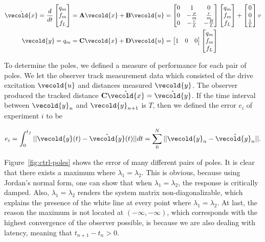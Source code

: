 \documentclass[11pt,titlepage]{report}
\let\vec\vecold
\newcommand{\vec}[1]{\mathbf{#1}}
\begin{document}
\begin{align} \label{eq:ctrl-bond-model}
	\dot{\vec{x}} = \frac{d}{dt}
	\begin{bmatrix}
		q_m \\
		f_m \\
		f_L
	\end{bmatrix} &= \mat{A} \vec{x} + \mat{B} \vec{u} =
	\begin{bmatrix}
		0 & 1 & 0 \\
		0 & -\frac{\rho}{m} & \frac{r}{m} \\
		0 & -\frac{r}{L} & -\frac{R}{L}
	\end{bmatrix}
	\begin{bmatrix}
		q_m \\
		f_m \\
		f_L
	\end{bmatrix} +
	\begin{bmatrix}
		0 \\
		0 \\
		\frac{1}{L}
	\end{bmatrix} v \\
	\vec{y} = q_m &= \mat{C} \vec{x} + \mat{D} \vec{u} =
	\begin{bmatrix}
		1 & 0 & 0
	\end{bmatrix}
	\begin{bmatrix}
		q_m \\
		f_m \\
		f_L
	\end{bmatrix}
\end{align}

To determine the poles, we defined a measure of performance for each pair of poles. We let the observer track measurement data which consisted of the drive excitation $\vec{u}$ and distances measured $\vec{y}$. The observer produced the tracked distance $\mat{C} \hat{\vec{x}} = \hat{\vec{y}}$. If the time interval between $\vec{y}_n$ and $\vec{y}_{n+1}$ is $T$, then we defined the error $e_i$ of experiment $i$ to be

\begin{equation}
	e_i = \int_{0}^{t_f} || \vec{y}(t) - \hat{\vec{y}}(t) || dt = \sum_{0}^{N} ||\vec{y}_n - \hat{\vec{y}_n} ||.
\end{equation}

Figure~\ref{fig:ctrl-poles} shows the error of many different pairs of poles. It is clear that there exists a maximum where $\lambda_1=\lambda_2$. This is obvious, because using Jordan's normal form, one can show that when $\lambda_1 = \lambda_2$, the response is critically damped. Also, $\lambda_1 = \lambda_2$ renders the system matrix non-diagonalizable, which explains the presence of the white line at every point where $\lambda_1=\lambda_2$. At last, the reason the maximum is not located at $(-\infty,-\infty)$, which corresponds with the highest convergence of the observer possible, is because we are also dealing with latency, meaning that $t_{n+1}-t_n>0$.  
\end{document}
